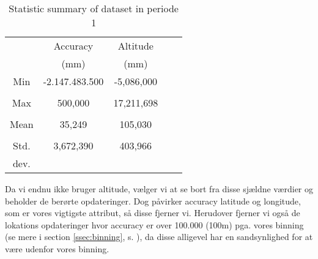 \begin{table}[H]
        \centering
        \small
        \setlength\tabcolsep{2pt}
        \begin{tabular}{|c|c|c|c|c|}
            \hline
                         & Accuracy           & Altitude     \\[-3pt]%
                         &  (mm)              & (mm)              \\
            \hline
                 Min     &  -2.147.483.500    & -5,086,000            \\
                         &                    &                    \\
            \hline
                 Max     &  500,000           & 17,211,698        \\
                         &                    &                      \\
            \hline
                 Mean    & 35,249             & 105,030               \\
                         &                    &                   \\
            \hline
                 Std.    & 3,672,390          & 403,966            \\
                 dev.    &                    &                   \\
            \hline
        \end{tabular}
        \caption{Statistic summary of dataset in periode 1} %
        \label{tab:stat_geo_p1}
\end{table}



Da vi endnu ikke bruger altitude, vælger vi at se bort fra disse sjældne værdier og beholder de berørte opdateringer. Dog påvirker accuracy latitude og longitude, som er vores vigtigste attribut, så disse fjerner vi. Herudover fjerner vi også de lokations opdateringer hvor accuracy er over 100.000 (100m) pga. vores binning (se mere i section \ref{ssec:binning}, s. \pageref{ssec:binning}), da disse alligevel har en sandsynlighed for at være udenfor vores binning. 

